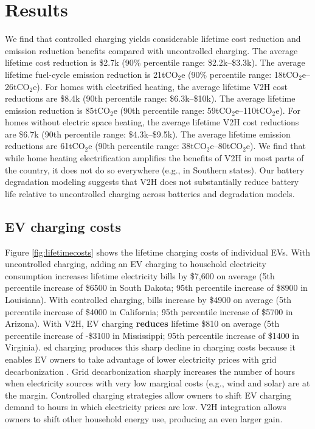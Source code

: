 \documentclass[11pt,preprint]{elsarticle}
\begin{document}
\section{Results}
We find that controlled charging yields considerable lifetime cost reduction and emission reduction benefits compared with uncontrolled charging. The average lifetime cost reduction is \$2.7k (90\% percentile range: \$2.2k--\$3.3k). The average lifetime fuel-cycle emission reduction is 21tCO$_2$e (90\% percentile range: 18tCO$_2$e--26tCO$_2$e). For homes with electrified heating, the average lifetime V2H cost reductions are \$8.4k (90th percentile range: \$6.3k--\$10k). The average lifetime emission reduction is 85tCO$_2$e (90th percentile range: 59tCO$_2$e--110tCO$_2$e). For homes without electric space heating, the average lifetime V2H cost reductions are \$6.7k (90th percentile range: \$4.3k--\$9.5k). The average lifetime emission reductions are 61tCO$_2$e (90th percentile range: 38tCO$_2$e--80tCO$_2$e). We find that while home heating electrification amplifies the benefits of V2H in most parts of the country, it does not do so everywhere (e.g., in Southern states). Our battery degradation modeling suggests that V2H does not substantially reduce battery life relative to uncontrolled charging across batteries and degradation models. %


\subsection{EV charging costs}

Figure \ref{fig:lifetimecosts} shows the lifetime charging costs of individual EVs. With uncontrolled charging, adding an EV charging to household electricity consumption increases lifetime electricity bills by \$7,600 on average (5th percentile increase of \$6500 in South Dakota; 95th percentile increase of \$8900 in Louisiana). With controlled charging, bills increase by \$4900 on average (5th percentile increase of \$4000 in California; 95th percentile increase of \$5700 in Arizona). With V2H, EV charging \textbf{reduces} lifetime  \$810 on average (5th percentile increase of -\$3100 in Mississippi; 95th percentile increase of \$1400 in Virginia). ed charging produces this sharp decline in charging costs because it enables EV owners to take advantage of lower electricity prices with grid decarbonization \cite{mills_impacts_2020}. Grid decarbonization sharply increases the number of hours when electricity sources with very low marginal costs (e.g., wind and solar) are at the margin. Controlled charging strategies allow owners to shift EV charging demand to hours in which electricity prices are low. V2H integration allows owners to shift other household energy use, producing an even larger gain. 
\end{document}
